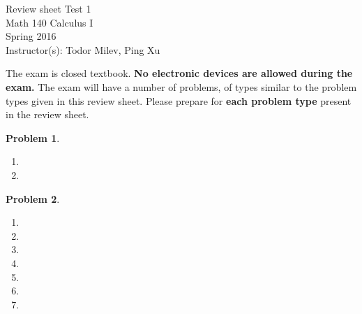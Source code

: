\documentclass{article}
\renewcommand{\fcProblemRef}{\theproblem.\theenumi}
\newtheorem{problem}{Problem}
\begin{document}
\begin{center}
\Large
Review sheet Test 1 \\ Math 140 Calculus I \\ \normalsize Spring 2016 \\ Instructor(s): Todor Milev, Ping Xu
\end{center}



\noindent The exam is closed textbook. \textbf{No electronic devices are allowed during the exam. } The exam will have a number of problems, of types similar to the problem types given in this review sheet. Please prepare for \textbf{each problem type} present in the review sheet. %

\begin{problem}~
\begin{multicols}{2}
\begin{enumerate}[ref={\fcProblemRef}]
\item 
\item 
\end{enumerate}
\end{multicols}
\end{problem}

\begin{problem}~
\begin{multicols}{2}
\begin{enumerate}[ref={\fcProblemRef}]
\item 
\item 

\item 
\item 
\item 
\item 

\item 

\end{enumerate}
\end{multicols}
\end{problem}

\end{document}
